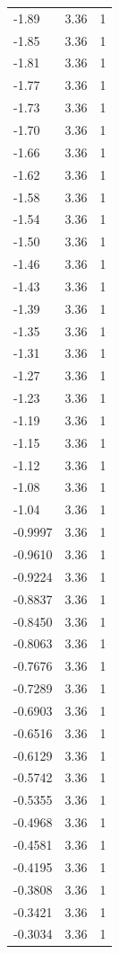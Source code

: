 \begin{longtable}{lrr}
  -1.89 & 3.36 & 1 \\
  -1.85 & 3.36 & 1 \\
  -1.81 & 3.36 & 1 \\
  -1.77 & 3.36 & 1 \\
  -1.73 & 3.36 & 1 \\
  -1.70 & 3.36 & 1 \\
  -1.66 & 3.36 & 1 \\
  -1.62 & 3.36 & 1 \\
  -1.58 & 3.36 & 1 \\
  -1.54 & 3.36 & 1 \\
  -1.50 & 3.36 & 1 \\
  -1.46 & 3.36 & 1 \\
  -1.43 & 3.36 & 1 \\
  -1.39 & 3.36 & 1 \\
  -1.35 & 3.36 & 1 \\
  -1.31 & 3.36 & 1 \\
  -1.27 & 3.36 & 1 \\
  -1.23 & 3.36 & 1 \\
  -1.19 & 3.36 & 1 \\
  -1.15 & 3.36 & 1 \\
  -1.12 & 3.36 & 1 \\
  -1.08 & 3.36 & 1 \\
  -1.04 & 3.36 & 1 \\
  -0.9997 & 3.36 & 1 \\
  -0.9610 & 3.36 & 1 \\
  -0.9224 & 3.36 & 1 \\
  -0.8837 & 3.36 & 1 \\
  -0.8450 & 3.36 & 1 \\
  -0.8063 & 3.36 & 1 \\
  -0.7676 & 3.36 & 1 \\
  -0.7289 & 3.36 & 1 \\
  -0.6903 & 3.36 & 1 \\
  -0.6516 & 3.36 & 1 \\
  -0.6129 & 3.36 & 1 \\
  -0.5742 & 3.36 & 1 \\
  -0.5355 & 3.36 & 1 \\
  -0.4968 & 3.36 & 1 \\
  -0.4581 & 3.36 & 1 \\
  -0.4195 & 3.36 & 1 \\
  -0.3808 & 3.36 & 1 \\
  -0.3421 & 3.36 & 1 \\
  -0.3034 & 3.36 & 1 \\

\end{longtable}

